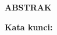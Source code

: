 \chapter*{}
\vspace*{-1.0cm}
\begin{center}
\normalfont\LARGE\textbf{ABSTRAK}
\end{center}
\textbf{Kata kunci:} 